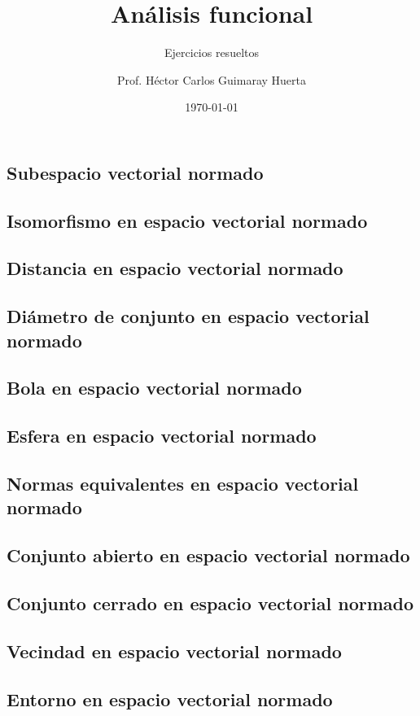 \documentclass[a4paper]{scrbook}
\title{Análisis funcional}
\subtitle{Ejercicios resueltos}
\author{Prof. Héctor Carlos Guimaray Huerta}
\date{\today}
\theoremstyle{definition}
\begin{document}
\maketitle
\tableofcontents

\chapter{}


\section{Subespacio vectorial normado}
\section{Isomorfismo en espacio vectorial normado}
\section{Distancia en espacio vectorial normado}
\section{Diámetro de conjunto en espacio vectorial normado}
\section{Bola en espacio vectorial normado}
\section{Esfera en espacio vectorial normado}
\section{Normas equivalentes en espacio vectorial normado}
\section{Conjunto abierto en espacio vectorial normado}
\section{Conjunto cerrado en espacio vectorial normado}
\section{Vecindad en espacio vectorial normado}
\section{Entorno en espacio vectorial normado}
\end{document}

